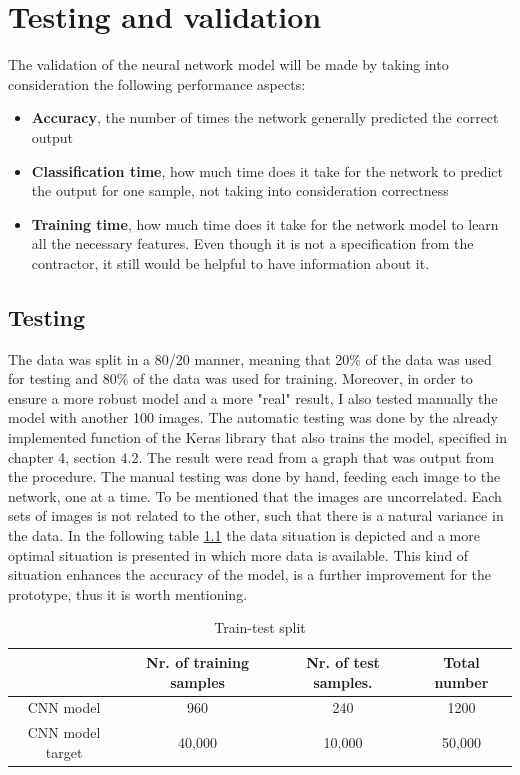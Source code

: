\documentclass[12pt,a4paper,twoside]{report}
\begin{document}
\chapter{Testing and validation}
\label{ch:results}
The validation of the neural network model will be made by taking into consideration the following performance aspects:
\begin{itemize}
     \item \textbf{Accuracy}, the number of times the network generally predicted the correct output
     \item \textbf{Classification time}, how much time does it take for the network to predict the output for one sample, not taking into consideration correctness
     \item \textbf{Training time}, how much time does it take for the network model to learn all the necessary features. Even though it is not a specification from the contractor, it still would be helpful to have information about it. 
\end{itemize}


\section{Testing}
The data was split in a 80/20 manner, meaning that 20\% of the data was used for testing and 80\% of the data was used for training. Moreover, in order to ensure a more robust model and a more "real" result, I also tested manually the model with another 100 images. The automatic testing was done by the already implemented function of the Keras library that also trains the model, specified in chapter 4, section 4.2. The result were read from a graph that was output from the procedure. The manual testing was done by hand, feeding each image to the network, one at a time. To be mentioned that the images are uncorrelated. Each sets of images is not related to the other, such that there is a natural variance in the data. In the following table \ref{tab:training_test} the data situation is depicted and a more optimal situation is presented in which more data is available. This kind of situation enhances the accuracy of the model, is a further improvement for the prototype, thus it is worth mentioning.

\begin {table}[h!]
\label{tab:training_test}
\begin{center}
 \begin{tabular}{|c |c| c | c|} 
 \hline
  & Nr. of training samples &  Nr. of test samples. & Total number\\ 
 \hline
 CNN model & 960 & 240 & 1200\\ 
 \hline
 CNN model target & 40,000 & 10,000 & 50,000 \\
 \hline
 \end{tabular}
\end{center}
\caption{Train-test split}
\end{table}
\end{document}
